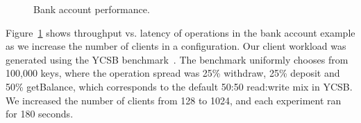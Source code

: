 \begin{figure}
  \centering
	\caption{Bank account performance.}
  \label{grf:BA}
\end{figure}

Figure~\ref{grf:BA} shows throughput vs. latency of operations in the bank
account example as we increase the number of clients in a 
configuration. Our client workload was generated using the YCSB
benchmark~\cite{YCSB}. The benchmark uniformly chooses from 100,000 keys, where
the operation spread was 25\% withdraw, 25\% deposit and 50\% getBalance, which
corresponds to the default 50:50 read:write mix in YCSB. We increased the
number of clients from 128 to 1024, and each experiment ran for 180 seconds.

